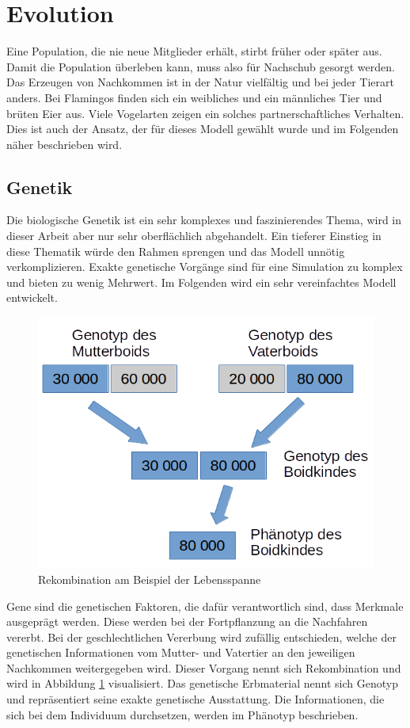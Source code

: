 \documentclass[draft=false
              ,paper=a4
              ,twoside=false
              ,fontsize=11pt
              ,headsepline
              ,BCOR10mm
              ,DIV11
              ,bibtotoc
              ,liststotoc
              ]{scrbook}
\begin{document}
\section{Evolution}
Eine Population, die nie neue Mitglieder erhält, stirbt früher oder später aus. Damit die Population überleben kann, muss also für Nachschub gesorgt werden. Das Erzeugen von Nachkommen ist in der Natur vielfältig und bei jeder Tierart anders. Bei Flamingos finden sich ein weibliches und ein männliches Tier und brüten Eier aus. Viele Vogelarten zeigen ein solches partnerschaftliches Verhalten. Dies ist auch der Ansatz, der für dieses Modell gewählt wurde und im Folgenden näher beschrieben wird.

\subsection{Genetik}
Die biologische Genetik ist ein sehr komplexes und faszinierendes Thema, wird in dieser Arbeit aber nur sehr oberflächlich abgehandelt. Ein tieferer Einstieg in diese Thematik würde den Rahmen sprengen und das Modell unnötig verkomplizieren. Exakte genetische Vorgänge \cite{genetik} sind für eine Simulation zu komplex und bieten zu wenig Mehrwert. Im Folgenden wird ein sehr vereinfachtes Modell entwickelt.

\begin{figure}[!h]
\centering
\includegraphics[scale=0.30]{project/rekombination.png}
\caption{Rekombination am Beispiel der Lebensspanne}
\label{rekombination}
\end{figure}

Gene sind die genetischen Faktoren, die dafür verantwortlich sind, dass Merkmale ausgeprägt werden. Diese werden bei der Fortpflanzung an die Nachfahren vererbt. Bei der geschlechtlichen Vererbung wird zufällig entschieden, welche der genetischen Informationen vom Mutter- und Vatertier an den jeweiligen Nachkommen weitergegeben wird. Dieser Vorgang nennt sich Rekombination und wird in Abbildung \ref{rekombination} visualisiert. Das genetische Erbmaterial nennt sich Genotyp und repräsentiert seine exakte genetische Ausstattung. Die Informationen, die sich bei dem Individuum durchsetzen, werden im Phänotyp beschrieben.
\end{document}
